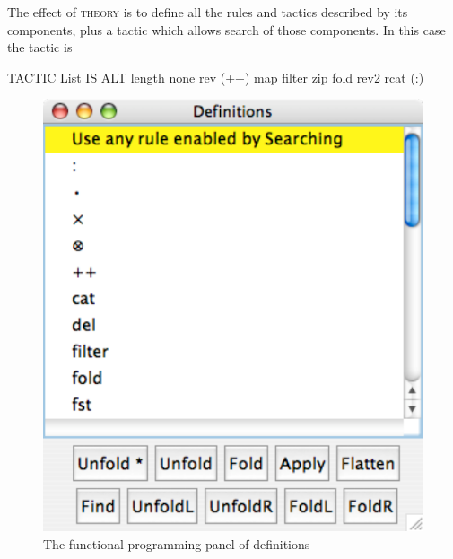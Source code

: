 The effect of \textsc{theory} is to define all the rules and tactics described by its components, plus a tactic which allows search of those components. In this case the tactic is
\begin{japeish}
TACTIC List IS ALT length none rev (++) map filter zip fold rev2 rcat (:)
\end{japeish}

\begin{figure}
\begin{center}
\includegraphics[scale=0.5]{pics/funcprog/definitionspanel}
\caption{The functional programming panel of definitions}
\label{fig:funcprog:definitionspanel}
\end{center}
\end{figure}

